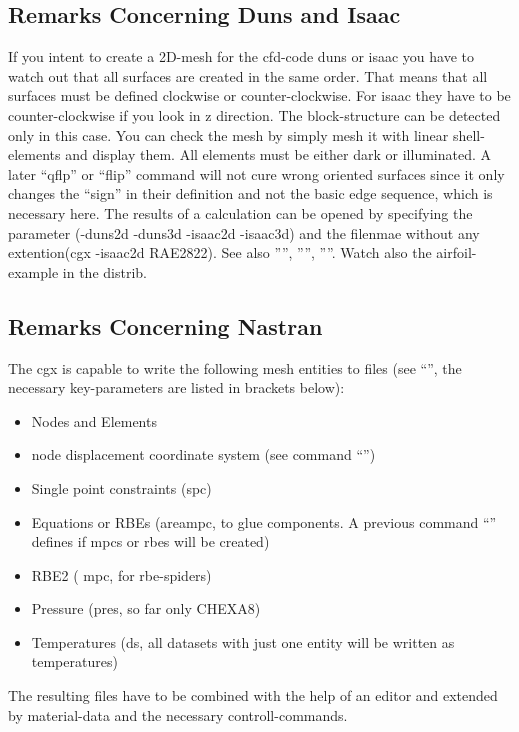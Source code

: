\documentclass{article}
\begin{document}
\begin{appendix}
\subsection{\label{Remarks Concerning Duns and Isaac}Remarks Concerning Duns and Isaac}
If you intent to create a 2D-mesh for the cfd-code duns or isaac you have to watch out that all surfaces are created in the same order. That means that all surfaces must be defined clockwise or counter-clockwise. For isaac they have to be counter-clockwise if you look in z direction. The block-structure can be detected only in this case. You can check the mesh by simply mesh it with linear shell-elements and display them. All elements must be either dark or illuminated. A later ``qflp'' or ``flip'' command will not cure wrong oriented surfaces since it only changes the ``sign'' in their definition and not the basic edge sequence, which is necessary here. The results of a calculation can be opened by specifying the parameter (-duns2d -duns3d -isaac2d -isaac3d) and the filenmae without any extention(cgx -isaac2d RAE2822). See also '''', '''', ''''. Watch also the airfoil-example in the distrib.

\subsection{\label{Remarks Concerning Nastran}Remarks Concerning Nastran}
The cgx is capable to write the following mesh entities to files (see ``'', the necessary key-parameters are listed in brackets below):
\begin{itemize}
\item Nodes and Elements 
\item node displacement coordinate system (see command ``'')
\item Single point constraints (spc)
\item Equations or RBEs (areampc, to glue components. A previous command ``'' defines if mpcs or rbes will be created)
\item RBE2 ( mpc, for rbe-spiders)
\item Pressure (pres, so far only CHEXA8)
\item Temperatures (ds, all datasets with just one entity will be written as temperatures)
\end{itemize}
The resulting files have to be combined with the help of an editor and extended by material-data and the necessary controll-commands. 


\end{appendix}
\end{document}
